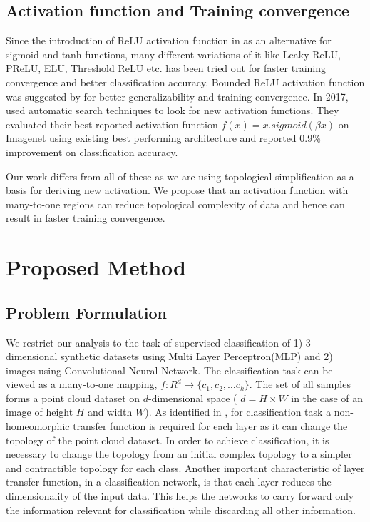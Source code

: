 \documentclass[wcp]{jmlr}
\begin{document}
\subsection{Activation function and Training convergence}
Since the introduction of ReLU activation function in \cite{alexnet} as an alternative for sigmoid and tanh functions, many different variations of it like Leaky ReLU, PReLU, ELU, Threshold ReLU etc. has been tried out for faster training convergence and better classification accuracy. Bounded ReLU activation function was suggested by \cite{liew2016bounded} for better generalizability and training convergence. In 2017, \cite{ramachandran2017searching} used automatic search techniques to look for new activation functions. They evaluated their  best reported activation function $f(x)=x.sigmoid(\beta x)$ on Imagenet using existing best performing architecture and reported 0.9\% improvement on classification accuracy.

Our work differs from all of these as we are using topological simplification as a basis for deriving new activation.  We propose that an activation function with many-to-one regions can reduce topological complexity of data and hence can result in faster training convergence.

\section{Proposed Method}
\subsection{Problem Formulation}
We restrict our analysis to the task of supervised classification of  1) 3-dimensional synthetic datasets using Multi Layer Perceptron(MLP) and 2) images using Convolutional Neural Network. The classification task can be viewed as a many-to-one mapping, $f:R^d \mapsto \{c_1, c_2, \ldots c_k\}$. The set of all samples forms a point cloud dataset on $d$-dimensional space ( $d=H \times W $  in the case of an image of height $H$ and width $W$). As identified in \cite{naitzat2020topology}, for classification task a non-homeomorphic transfer function is required for each layer as it can change the topology of the point cloud dataset. In order to achieve classification, it is necessary to change the topology from an initial complex topology to a simpler and contractible topology for each class. Another important characteristic of layer transfer function, in a classification network, is that each layer reduces the dimensionality of the input data. This helps the networks to carry forward only the information relevant for classification while discarding all other information.
\end{document}
